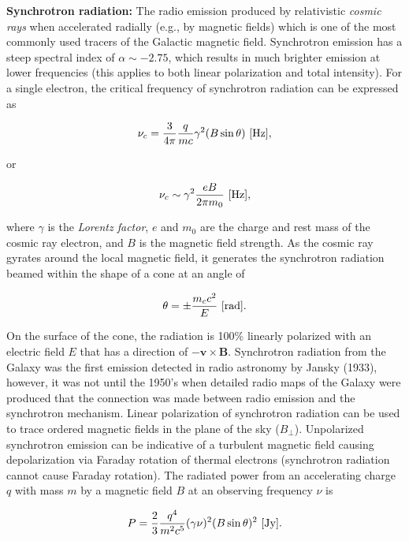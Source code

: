 \documentclass[a4paper,10pt]{article}
\begin{document}
{\noindent}\textbf{Synchrotron radiation:} The radio emission produced by relativistic \textit{cosmic rays} when accelerated radially (e.g., by magnetic fields) which is one of the most commonly used tracers of the Galactic magnetic field. Synchrotron emission has a steep spectral index of $\alpha\sim-2.75$, which results in much brighter emission at lower frequencies (this applies to both linear polarization and total intensity). For a single electron, the critical frequency of synchrotron radiation can be expressed as

\begin{align*}
    \nu_c = \dfrac{3}{4\pi}\dfrac{q}{mc}\gamma^2(B\sin\theta)~[{\rm Hz}],
\end{align*}

{\noindent} or

\begin{align*}
\nu_c \sim \gamma^2 \frac{eB}{2\pi m_0} ~ [{\rm Hz}],
\end{align*}

{\noindent}where $\gamma$ is the \textit{Lorentz factor}, $e$ and $m_0$ are the charge and rest mass of the cosmic ray electron, and $B$ is the magnetic field strength. As the cosmic ray gyrates around the local magnetic field, it generates the synchrotron radiation beamed within the shape of a cone at an angle of 

\begin{align*}
    \theta = \pm \frac{m_cc^2}{E} ~ [{\rm rad}].
\end{align*}

{\noindent}On the surface of the cone, the radiation is 100\% linearly polarized with an electric field $E$ that has a direction of $-\mathbf{v\times B}$. Synchrotron radiation from the Galaxy was the first emission detected in radio astronomy by Jansky (1933), however, it was not until the 1950's when detailed radio maps of the Galaxy were produced that the connection was made between radio emission and the synchrotron mechanism. Linear polarization of synchrotron radiation can be used to trace ordered magnetic fields in the plane of the sky ($B_\perp$). Unpolarized synchrotron emission can be indicative of a turbulent magnetic field causing depolarization via Faraday rotation of thermal electrons (synchrotron radiation cannot cause Faraday rotation). The radiated power from an accelerating charge $q$ with mass $m$ by a magnetic field $B$ at an observing frequency $\nu$ is

\begin{align*}
    P = \frac{2}{3}\dfrac{q^4}{m^2c^5}(\gamma\nu)^2(B\sin\theta)^2 ~ [{\rm Jy}].
\end{align*}
\end{document}
